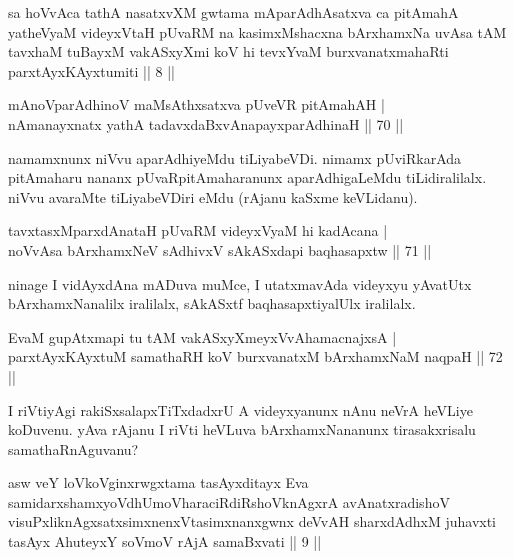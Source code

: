 \begin{kandikeshl}
sa hoVvAca tathA nasatxvXM gwtama mAparAdhAsatxva ca pitAmahA yatheVyaM videyxVtaH pUvaRM na kasimxMshacxna bArxhamxNa uvAsa tAM tavxhaM tuBayxM vakASxyXmi koV hi tevxYvaM burxvanatxmahaRti parxtAyxKAyxtumiti || 8 ||
\end{kandikeshl}


\begin{shl}
mAnoV\s parAdhinoV maMsAthxsatxva pUveVR pitAmahAH | \\
nAmanayxnatx yathA tadavxdaBxvAnapayxparAdhinaH \hfill|| 70 || 
\end{shl}

\begin{artha}
namamxnunx niVvu aparAdhiyeMdu tiLiyabeVDi. nimamx pUviRkarAda\break 
pitAmaharu nananx pUvaRpitAmaharanunx aparAdhigaLeMdu tiLidiralilalx. 
niVvu avaraMte tiLiyabeVDiri eMdu (rAjanu kaSxme keVLidanu).
\end{artha}

\begin{shl}
tavxtasxMparxdAnataH pUvaRM videyxVyaM hi kadAcana | \\
noVvAsa bArxhamxNeV sAdhivxV sAkASxdapi baqhasapxtw \hfill|| 71 || 
\end{shl}

\begin{artha}
ninage I vidAyxdAna mADuva muMce, I utatxmavAda videyxyu yAvatUtx 
bArxhamxNanalilx iralilalx, sAkASxtf baqhasapxtiyalUlx iralilalx.
\end{artha}

\begin{shl}
EvaM gupAtxmapi tu tAM vakASxyXmeyxVvAhamacnajxsA | \\
parxtAyxKAyxtuM samathaRH koV burxvanatxM bArxhamxNaM naqpaH \hfill|| 72 || 
\end{shl}

\begin{artha}
I riVtiyAgi rakiSxsalapxTiTxdadxrU A videyxyanunx nAnu neVrA heVLiye\break 
koDuvenu. yAva rAjanu I riVti heVLuva bArxhamxNananunx tirasakxrisalu 
samathaRnAguvanu?
\end{artha}


\begin{kandikeshl}
asw veY loVkoV\s ginxrwgxtama tasAyxditayx Eva samidarxshamxyoV\break dhUmoV\s haraciRdiRshoV\s knAgxrA avAnatxradishoV visuPxliknAgxsatxsimxnenxV\-\break tasimxnanxgwnx deVvAH sharxdAdhxM juhavxti tasAyx AhuteyxY soVmoV rAjA samaBxvati || 9 ||
\end{kandikeshl}

